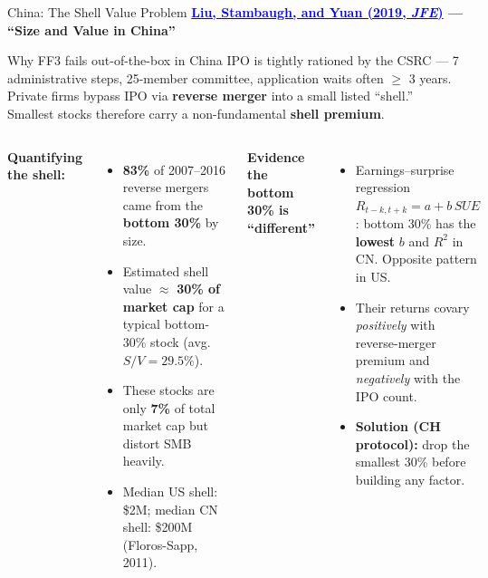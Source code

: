 \documentclass{beamer}
\begin{document}
\begin{frame}{China: The Shell Value Problem}
	\small
	\textbf{\href{https://doi.org/10.1016/j.jfineco.2019.03.008}{\textcolor{blue}{Liu, Stambaugh, and Yuan (2019, \textit{JFE})}} --- ``Size and Value in China''}
	\vspace{2pt}
	\begin{block}{Why FF3 fails out-of-the-box in China}
		IPO is tightly rationed by the CSRC --- 7 administrative steps, 25-member committee, application waits often $\geq$ 3 years. Private firms bypass IPO via \textbf{reverse merger} into a small listed ``shell.'' Smallest stocks therefore carry a non-fundamental \textbf{shell premium}.
	\end{block}
	\begin{columns}
		\textbf{Quantifying the shell:}
		\begin{itemize}\setlength\itemsep{1pt}
			\item \textbf{83\%} of 2007--2016 reverse mergers came from the \textbf{bottom 30\%} by size.
			\item Estimated shell value $\approx$ \textbf{30\% of market cap} for a typical bottom-30\% stock (avg.\ $S/V = 29.5\%$).
			\item These stocks are only \textbf{7\%} of total market cap but distort SMB heavily.
			\item Median US shell: \$2M; median CN shell: \$200M (Floros-Sapp, 2011).
		\end{itemize}
		\textbf{Evidence the bottom 30\% is ``different''}
		\begin{itemize}\setlength\itemsep{1pt}
			\item Earnings--surprise regression $R_{t-k,t+k} = a + b\,SUE$: bottom 30\% has the \textbf{lowest} $b$ and $R^2$ in CN. Opposite pattern in US.
			\item Their returns covary \textit{positively} with reverse-merger premium and \textit{negatively} with the IPO count.
			\item \textbf{Solution (CH protocol):} drop the smallest 30\% before building any factor.
		\end{itemize}
	\end{columns}
\end{frame}
\end{document}
